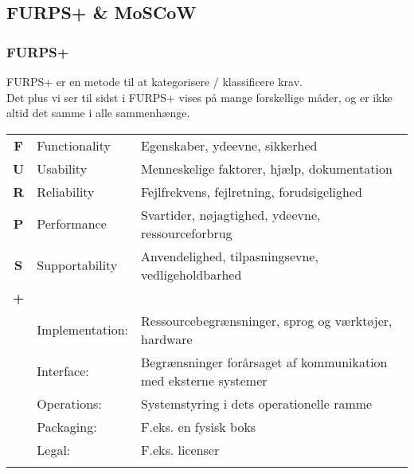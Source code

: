 \subsection{FURPS+ \& MoSCoW}

\subsubsection{FURPS+}
FURPS+ er en metode til at kategorisere / klassificere krav. \\ Det plus vi ser til sidst i FURPS+ vises på mange forskellige måder, og er ikke altid det samme i alle sammenhænge.

\begin{center}
\begin{tabular}{cll}
       \textbf{F}   &   Functionality   &
       Egenskaber, ydeevne, sikkerhed \\

       \textbf{U}   &   Usability       &
       Menneskelige faktorer, hjælp, dokumentation      \\

       \textbf{R}   &   Reliability     &
       Fejlfrekvens, fejlretning, forudsigelighed     \\

       \textbf{P}   &   Performance     &
       Svartider, nøjagtighed, ydeevne, ressourceforbrug     \\
       \textbf{S}   &   Supportability  &
       Anvendelighed, tilpasningsevne, vedligeholdbarhed     \\
       \textbf{+}   &                   &     \\

       &   Implementation: &   Ressourcebegrænsninger, sprog og værktøjer, hardware   \\

       &   Interface:      &   Begrænsninger forårsaget af kommunikation med eksterne systemer     \\

       &   Operations:     &   Systemstyring i dets operationelle ramme  \\

       &   Packaging:      &   F.eks. en fysisk boks  \\

       &    Legal:         &   F.eks. licenser  \\\\
\end{tabular}
\end{center}

